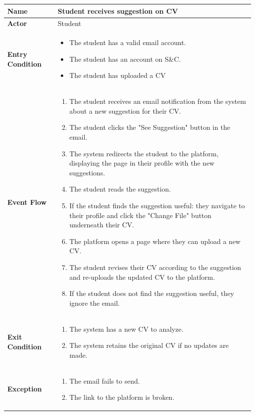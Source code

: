 \begin{longtable}{|p{}|p{}|}
\hline
\textbf{Name} &  Student receives suggestion on CV\\
\hline
\textbf{Actor} &  Student\\
\hline
\textbf{Entry Condition} &  
\begin{itemize}
    \item  The student has a valid email account.
    \item  The student has an account on S\&C.
    \item  The student has uploaded a CV
\end{itemize}\\
\hline
\textbf{Event Flow} &  
\begin{enumerate}
    \item The student receives an email notification from the system about a new suggestion for their CV.
    \item The student clicks the "See Suggestion" button in the email.
    \item  The system redirects the student to the platform, displaying the page in their profile with the new suggestions.
    \item The student reads the suggestion.
    \item If the student finds the suggestion useful: they navigate to their profile and click the "Change File" button underneath their CV.
    \item The platform opens a page where they can upload a new CV.
    \item The student revises their CV according to the suggestion and re-uploads the updated CV to the platform.
    \item If the student does not find the suggestion useful, they ignore the email.
\end{enumerate}\\
\hline
\textbf{Exit Condition} &  
\begin{enumerate}
    \item  The system has a new CV to analyze.
    \item  The system retains the original CV if no updates are made.
\end{enumerate}\\
\hline
\textbf{Exception} &  
\begin{enumerate}
    \item  The email fails to send.
    \item  The link to the platform is broken.
\end{enumerate}\\
\hline
\end{longtable}

